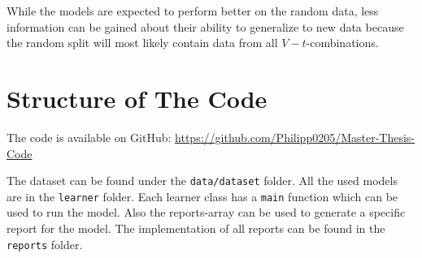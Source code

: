 While the models are expected to perform better on the random data, less information
can be gained about their ability to generalize to new data because the random split
will most likely contain data from all $V-t$-combinations.


\section{Structure of The Code}\label{sec:structure-of-the-code}
The code is available on GitHub: \url{https://github.com/Philipp0205/Master-Thesis-Code}

The dataset can be found under the \texttt{data/dataset} folder.
All the used models are in the \texttt{learner} folder. Each learner class has a
\texttt{main} function which can be used to run the model.
Also the reports-array can be used to generate a specific report for the model.
The implementation of all reports can be found in the \texttt{reports} folder.





